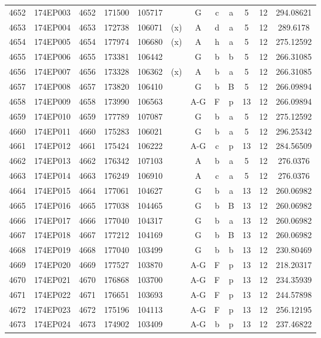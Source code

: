 \begin{tabular}{|*{12}{c|}}
4652 & 174EP003 & 4652 & 171500 & 105717 &  & G & c & a & 5 & 12 & 294.08621 \\ 
4653 & 174EP004 & 4653 & 172738 & 106071 & (x) & A & d & a & 5 & 12 & 289.6178 \\ 
4654 & 174EP005 & 4654 & 177974 & 106680 & (x) & A & h & a & 5 & 12 & 275.12592 \\ 
4655 & 174EP006 & 4655 & 173381 & 106442 &  & G & b & b & 5 & 12 & 266.31085 \\ 
4656 & 174EP007 & 4656 & 173328 & 106362 & (x) & A & b & a & 5 & 12 & 266.31085 \\ 
4657 & 174EP008 & 4657 & 173820 & 106410 &  & G & b & B & 5 & 12 & 266.09894 \\ 
4658 & 174EP009 & 4658 & 173990 & 106563 &  & A-G & F & p & 13 & 12 & 266.09894 \\ 
4659 & 174EP010 & 4659 & 177789 & 107087 &  & G & b & a & 5 & 12 & 275.12592 \\ 
4660 & 174EP011 & 4660 & 175283 & 106021 &  & G & b & a & 5 & 12 & 296.25342 \\ 
4661 & 174EP012 & 4661 & 175424 & 106222 &  & A-G & c & p & 13 & 12 & 284.56509 \\ 
4662 & 174EP013 & 4662 & 176342 & 107103 &  & A & b & a & 5 & 12 & 276.0376 \\ 
4663 & 174EP014 & 4663 & 176249 & 106910 &  & A & c & a & 5 & 12 & 276.0376 \\ 
4664 & 174EP015 & 4664 & 177061 & 104627 &  & G & b & a & 13 & 12 & 260.06982 \\ 
4665 & 174EP016 & 4665 & 177038 & 104465 &  & G & b & B & 13 & 12 & 260.06982 \\ 
4666 & 174EP017 & 4666 & 177040 & 104317 &  & G & b & a & 13 & 12 & 260.06982 \\ 
4667 & 174EP018 & 4667 & 177212 & 104169 &  & G & b & B & 13 & 12 & 260.06982 \\ 
4668 & 174EP019 & 4668 & 177040 & 103499 &  & G & b & b & 13 & 12 & 230.80469 \\ 
4669 & 174EP020 & 4669 & 177527 & 103870 &  & A-G & F & p & 13 & 12 & 218.20317 \\ 
4670 & 174EP021 & 4670 & 176868 & 103700 &  & A-G & F & p & 13 & 12 & 234.35939 \\ 
4671 & 174EP022 & 4671 & 176651 & 103693 &  & A-G & F & p & 13 & 12 & 244.57898 \\ 
4672 & 174EP023 & 4672 & 175196 & 104113 &  & A-G & F & p & 13 & 12 & 256.12195 \\ 
4673 & 174EP024 & 4673 & 174902 & 103409 &  & A-G & b & p & 13 & 12 & 237.46822 \\ 

\end{tabular}
